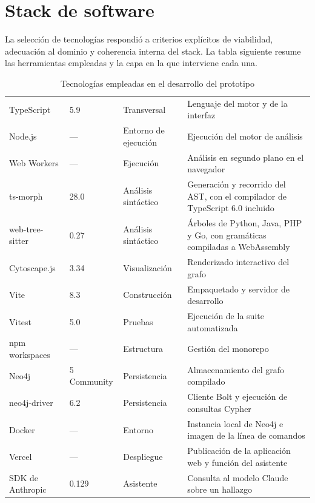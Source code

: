 \section{Stack de software}\label{sec:n4.3}

La selección de tecnologías respondió a criterios explícitos de viabilidad, adecuación al dominio y coherencia interna del stack. La tabla siguiente resume las herramientas empleadas y la capa en la que interviene cada una.

\begin{table}[H]
    \centering
    \caption{Tecnologías empleadas en el desarrollo del prototipo}
    \label{tab:stack}
    \small
    \begin{tabularx}{\textwidth}{l l l L}
        \toprule
         &  &  &  \\
        \midrule
        TypeScript & 5.9 & Transversal & Lenguaje del motor y de la interfaz \\
        Node.js & — & Entorno de ejecución & Ejecución del motor de análisis \\
        Web Workers & — & Ejecución & Análisis en segundo plano en el navegador \\
        ts-morph & 28.0 & Análisis sintáctico & Generación y recorrido del AST, con el compilador de TypeScript 6.0 incluido \\
        web-tree-sitter & 0.27 & Análisis sintáctico & Árboles de Python, Java, PHP y Go, con gramáticas compiladas a WebAssembly \\
        Cytoscape.js & 3.34 & Visualización & Renderizado interactivo del grafo \\
        Vite & 8.3 & Construcción & Empaquetado y servidor de desarrollo \\
        Vitest & 5.0 & Pruebas & Ejecución de la suite automatizada \\
        npm workspaces & — & Estructura & Gestión del monorepo \\
        Neo4j & 5 Community & Persistencia & Almacenamiento del grafo compilado \\
        neo4j-driver & 6.2 & Persistencia & Cliente Bolt y ejecución de consultas Cypher \\
        Docker & — & Entorno & Instancia local de Neo4j e imagen de la línea de comandos \\
        Vercel & — & Despliegue & Publicación de la aplicación web y función del asistente \\
        SDK de Anthropic & 0.129 & Asistente & Consulta al modelo Claude sobre un hallazgo \\
        \bottomrule
    \end{tabularx}
\end{table}


